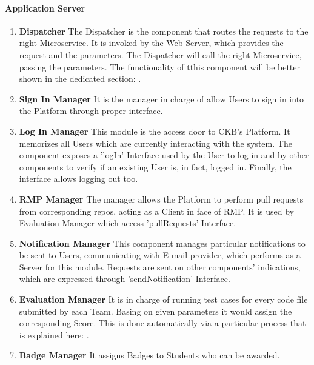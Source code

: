 \paragraph{Application Server}
\begin{enumerate}
    \item \textbf{Dispatcher} The Dispatcher is the component that routes the requests to the right Microservice. It is invoked by the Web Server, which provides the request and the parameters. The Dispatcher will call the right Microservice, passing the parameters. The functionality of tthis component will be better shown in the dedicated section: .
    \item \textbf{Sign In Manager} It is the manager in charge of allow Users to sign in into the Platform through proper interface.
    \item \textbf{Log In Manager} This module is the access door to CKB's Platform. It memorizes all Users which are currently interacting with the system. The component exposes a 'logIn' Interface used by the User to log in 
    and by other components to verify if an existing User is, in fact, logged in. Finally, the interface allows logging out too.
    \item \textbf{RMP Manager} The manager allows the Platform to perform pull requests from corresponding repos, acting as a Client in face of RMP. It is used by Evaluation Manager which access 'pullRequests' Interface.
    \item \textbf{Notification Manager} This component manages particular notifications to be sent to Users, communicating with E-mail provider, which performs as a Server for this module. Requests are sent on other 
    components' indications, which are expressed through 'sendNotification' Interface.
    \item \textbf{Evaluation Manager} It is in charge of running test cases for every code file submitted by each Team. Basing on given parameters it would assign the corresponding Score. This is done automatically via a particular process that is explained here: .
    \item \textbf{Badge Manager} It assigns Badges to Students who can be awarded. 
   

\end{enumerate}

